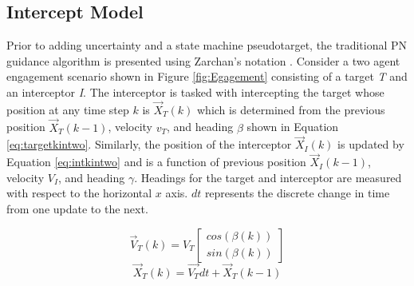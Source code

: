 \documentclass[conference]{IEEEtran}
\begin{document}



\subsection{Intercept Model}
Prior to adding uncertainty and a state machine pseudotarget, the traditional PN guidance algorithm is presented using Zarchan's notation \cite{zarchan}. Consider a two agent engagement scenario shown in Figure \ref{fig:Egagement} consisting of a target \textit{T} and an interceptor \textit{I}. The interceptor is tasked with intercepting the target whose position at any time step $k$ is $\overrightarrow{X}_T(k)$ which is determined from the previous position $\overrightarrow{X}_T(k-1)$, velocity $v_T$, and heading $\beta$ shown in Equation \ref{eq:targetkintwo}. Similarly, the position of the interceptor $\overrightarrow{X}_I(k)$ is updated by Equation \ref{eq:intkintwo} and is a function of previous position $\overrightarrow{X}_I(k-1)$, velocity $V_I$, and heading $\gamma$. Headings for the target and interceptor are measured with respect to the horizontal $x$ axis. $dt$ represents the discrete change in time from one update to the next.



\begin{equation}\label{eq:targetkin}
\overrightarrow{V}_{T}(k) =  V_{T} \begin{bmatrix} cos(\beta(k)) \\ sin(\beta(k)) \end{bmatrix}
\end{equation}
\begin{equation}\label{eq:targetkintwo}
\overrightarrow{X}_T(k) =  \overrightarrow{V_T}dt + \overrightarrow{X}_T(k-1) 
\end{equation}
\end{document}
